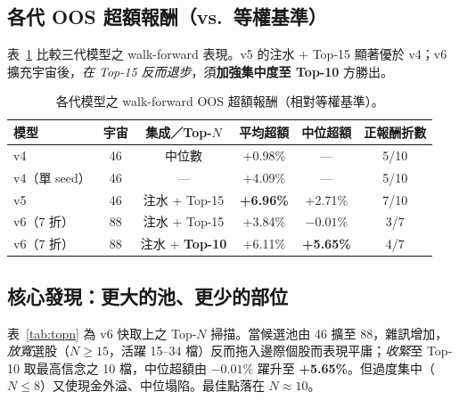 \documentclass[11pt, fontset=none]{ctexart}
\begin{document}
\subsection{各代 OOS 超額報酬（vs.\ 等權基準）}
表~\ref{tab:gen} 比較三代模型之 walk-forward 表現。v5 的注水 + Top-15 顯著優於 v4；v6 擴充宇宙後，\emph{在 Top-15 反而退步}，須\textbf{加強集中度至 Top-10} 方勝出。

\begin{table}[h]
  \centering
  \caption{各代模型之 walk-forward OOS 超額報酬（相對等權基準）。}
  \label{tab:gen}
  \small
  \begin{tabular}{lccccc}
    \toprule
    模型         & 宇宙 & 集成／Top-$N$           & 平均超額             & 中位超額             & 正報酬折數 \\
    \midrule
    v4         & 46 & 中位數                  & +0.98\%          & ---              & 5/10  \\
    v4（單 seed） & 46 & ---                  & +4.09\%          & ---              & 5/10  \\
    v5         & 46 & 注水 + Top-15          & \textbf{+6.96\%} & +2.71\%          & 7/10  \\
    v6（7 折）    & 88 & 注水 + Top-15          & +3.84\%          & $-0.01\%$        & 3/7   \\
    v6（7 折）    & 88 & 注水 + \textbf{Top-10} & +6.11\%          & \textbf{+5.65\%} & 4/7   \\
    \bottomrule
  \end{tabular}
\end{table}

\subsection{核心發現：更大的池、更少的部位}
表~\ref{tab:topn} 為 v6 快取上之 Top-$N$ 掃描。當候選池由 46 擴至 88，雜訊增加，\emph{放寬}選股（$N\geq15$，活躍 15--34 檔）反而拖入邊際個股而表現平庸；\emph{收緊}至 Top-10 取最高信念之 10 檔，中位超額由 $-0.01\%$ 躍升至 \textbf{+5.65\%}。但過度集中（$N\leq8$）又使現金外溢、中位塌陷。最佳點落在 $N\approx10$。
\end{document}
